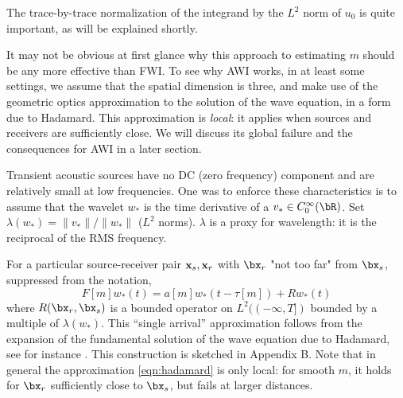The trace-by-trace normalization of the integrand by the
$L^2$ norm of $u_0$ is quite important, as will be explained shortly.

It may not be obvious at first glance why this approach to estimating $m$ should be any more effective than FWI. To see why AWI works, in at least some settings, we assume that the spatial dimension is three, and make use of the geometric optics approximation to the solution of the wave equation, in a form due to Hadamard. This approximation is {\em local}: it applies when sources and receivers are sufficiently close. We will discuss its global failure and the consequences for AWI in a later section.

Transient acoustic sources have no DC (zero frequency) component and are relatively small at low frequencies. One was to enforce these characteristics is to assume that the wavelet $w_*$ is the time derivative of a $v_* \in C_0^{\infty}(\bR)$. Set $\lambda(w_*) = \|v_*\|/\|w_*\|$ ($L^2$ norms). $\lambda$ is a proxy for wavelength: it is the reciprocal of the RMS frequency.

For a particular source-receiver pair ${\bf x}_s,{\bf x}_r$ with $\bx_r$ "not too far" from $\bx_s$, suppressed from the notation,
\begin{equation}
  \label{eqn:hadamard}
  F[m]w_*(t) = a[m]w_*(t-\tau[m]) + Rw_*(t)
\end{equation}
where $R(\bx_r,\bx_s)$ is a bounded operator on $L^2((-\infty,T])$ bounded by a multiple of $\lambda(w_*)$. This ``single arrival'' approximation  follows from the expansion of the fundamental solution of the wave equation due to Hadamard, see for instance \cite{Friedlander:75}. This construction is sketched in Appendix B. Note that in general the approximation \ref{eqn:hadamard} is only local: for smooth $m$, it holds for $\bx_r$ sufficiently close to $\bx_s$, but fails at larger distances.

